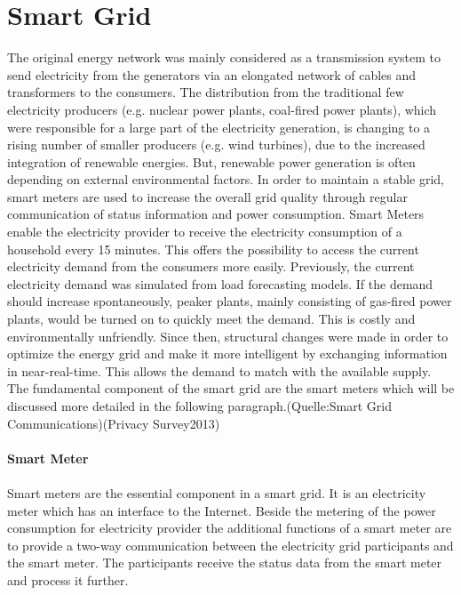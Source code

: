 \section{Smart Grid}
The original energy network was mainly considered as a transmission system to send electricity from the generators via an elongated network of cables and transformers to the consumers.%
The distribution from the traditional few electricity producers (e.g. nuclear power plants, coal-fired power plants), which were responsible for a large part of the electricity generation, is changing to a rising number of smaller producers (e.g. wind turbines), due to the increased integration of renewable energies. %
But, renewable power generation is often depending on external environmental factors. In order to maintain a stable grid, smart meters are used to increase the overall grid quality through regular communication of status information and power consumption. Smart Meters enable the electricity provider to receive the electricity consumption of a household every 15 minutes. This offers the possibility to access the current electricity demand from the consumers more easily. Previously, the current electricity demand was simulated from load forecasting models. If the demand should increase spontaneously, peaker plants, mainly consisting of gas-fired power plants, would be turned on to quickly meet the demand. This is costly and environmentally unfriendly. 
Since then, structural changes were made in order to optimize the energy grid and make it more intelligent by exchanging information in near-real-time. This allows the demand to match with the available supply. The fundamental component of the smart grid are the smart meters which will be discussed more detailed in the following paragraph.(Quelle:Smart Grid Communications)(Privacy Survey2013)\\
\\
\textbf{Smart Meter}
\\
\\
Smart meters are the essential component in a smart grid. It is an electricity meter which has an interface to the Internet. Beside the metering of the power consumption for electricity provider the additional functions of a smart meter are to provide a two-way communication between the electricity grid participants and the smart meter. The participants receive the status data from the smart meter and process it further.

